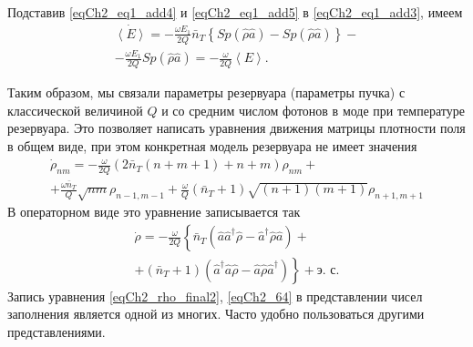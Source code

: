 Подставив \eqref{eqCh2_eq1_add4} и \eqref{eqCh2_eq1_add5} в 
\eqref{eqCh2_eq1_add3}, имеем
\begin{eqnarray}
\dot{\left<E\right>} =
- \frac{\omega E_1}{2Q}\bar{n}_T
\left\{Sp\left(\hat{\rho}\hat{a}\right) -
Sp\left(\hat{\rho}\hat{a}\right)\right\} -
\nonumber \\
- \frac{\omega E_1}{2Q}Sp\left(\hat{\rho}\hat{a}\right) = 
- \frac{\omega}{2Q}\left<E\right>.
\label{eqCh2_61}
\end{eqnarray}

Таким образом, мы связали параметры резервуара (параметры
пучка) с классической величиной $Q$ и со средним числом фотонов в моде 
при температуре резервуара. Это позволяет написать уравнения движения
матрицы плотности поля в общем виде, при этом конкретная модель
резервуара не имеет значения 
\begin{eqnarray}
\dot{\rho}_{nm} = - \frac{\omega}{2 Q}
\left(2 \bar{n}_T\left( n + m + 1\right) + n + m \right)\rho_{nm} +
\nonumber \\
+ \frac{\omega \bar{n}_T}{Q}\sqrt{nm}\rho_{n - 1, m - 1} +
\frac{\omega}{Q}\left(\bar{n}_T + 1\right)
\sqrt{\left(n + 1\right)\left(m + 1\right)}
\rho_{n + 1, m + 1}
\label{eqCh2_63}
\end{eqnarray}
В операторном виде это уравнение записывается так
\begin{eqnarray}
\dot{\rho} = - \frac{\omega}{2 Q}
\left\{
\bar{n}_T\left(\hat{a}\hat{a}^{\dag}\hat{\rho} - 
\hat{a}^{\dag}\hat{\rho}\hat{a}\right)
\right. +
\nonumber \\
+
\left .
\left(\bar{n}_T + 1\right)\left(\hat{a}^{\dag}\hat{a}\hat{\rho} - 
\hat{a}\hat{\rho}\hat{a}^{\dag}\right)
\right\} + \mbox{э. с.}
\label{eqCh2_64}
\end{eqnarray}
Запись уравнения \eqref{eqCh2_rho_final2}, \ref{eqCh2_64} в
представлении чисел заполнения является одной из многих. Часто удобно
пользоваться другими представлениями.  
